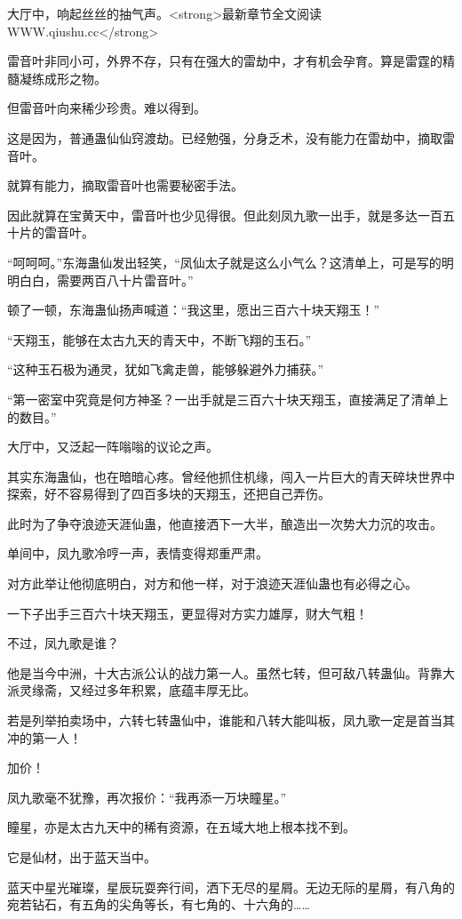 \begin{this_body}
大厅中，响起丝丝的抽气声。<strong>最新章节全文阅读WWW.qiushu.cc</strong>

雷音叶非同小可，外界不存，只有在强大的雷劫中，才有机会孕育。算是雷霆的精髓凝练成形之物。

但雷音叶向来稀少珍贵。难以得到。

这是因为，普通蛊仙仙窍渡劫。已经勉强，分身乏术，没有能力在雷劫中，摘取雷音叶。

就算有能力，摘取雷音叶也需要秘密手法。

因此就算在宝黄天中，雷音叶也少见得很。但此刻凤九歌一出手，就是多达一百五十片的雷音叶。

“呵呵呵。”东海蛊仙发出轻笑，“凤仙太子就是这么小气么？这清单上，可是写的明明白白，需要两百八十片雷音叶。”

顿了一顿，东海蛊仙扬声喊道：“我这里，愿出三百六十块天翔玉！”

“天翔玉，能够在太古九天的青天中，不断飞翔的玉石。”

“这种玉石极为通灵，犹如飞禽走兽，能够躲避外力捕获。”

“第一密室中究竟是何方神圣？一出手就是三百六十块天翔玉，直接满足了清单上的数目。”

大厅中，又泛起一阵嗡嗡的议论之声。

其实东海蛊仙，也在暗暗心疼。曾经他抓住机缘，闯入一片巨大的青天碎块世界中探索，好不容易得到了四百多块的天翔玉，还把自己弄伤。

此时为了争夺浪迹天涯仙蛊，他直接洒下一大半，酿造出一次势大力沉的攻击。

单间中，凤九歌冷哼一声，表情变得郑重严肃。

对方此举让他彻底明白，对方和他一样，对于浪迹天涯仙蛊也有必得之心。

一下子出手三百六十块天翔玉，更显得对方实力雄厚，财大气粗！

不过，凤九歌是谁？

他是当今中洲，十大古派公认的战力第一人。虽然七转，但可敌八转蛊仙。背靠大派灵缘斋，又经过多年积累，底蕴丰厚无比。

若是列举拍卖场中，六转七转蛊仙中，谁能和八转大能叫板，凤九歌一定是首当其冲的第一人！

加价！

凤九歌毫不犹豫，再次报价：“我再添一万块瞳星。”

瞳星，亦是太古九天中的稀有资源，在五域大地上根本找不到。

它是仙材，出于蓝天当中。

蓝天中星光璀璨，星辰玩耍奔行间，洒下无尽的星屑。无边无际的星屑，有八角的宛若钻石，有五角的尖角等长，有七角的、十六角的……


\end{this_body}
